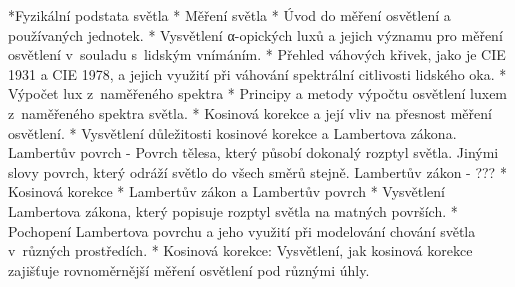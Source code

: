 \medskip
\begitems
    *Fyzikální podstata světla
    * Měření světla
    *     Úvod do měření osvětlení a používaných jednotek.
    *     Vysvětlení α-opických luxů a jejich významu pro měření osvětlení v~souladu s~lidským vnímáním.
    *     Přehled váhových křivek, jako je CIE 1931 a CIE 1978, a jejich využití při váhování spektrální citlivosti lidského oka.
    * Výpočet lux z~naměřeného spektra
    *     Principy a metody výpočtu osvětlení luxem z~naměřeného spektra světla.
    *     Kosinová korekce a její vliv na přesnost měření osvětlení.
       * Vysvětlení důležitosti kosinové korekce a Lambertova zákona.
Lambertův povrch - Povrch tělesa, který působí dokonalý rozptyl světla. Jinými slovy povrch, který odráží světlo do všech směrů stejně.
Lambertův zákon - ???
    * Kosinová korekce
    * Lambertův zákon a Lambertův povrch
    *     Vysvětlení Lambertova zákona, který popisuje rozptyl světla na matných površích.
    *     Pochopení Lambertova povrchu a jeho využití při modelování chování světla v~různých prostředích.
    *     Kosinová korekce: Vysvětlení, jak kosinová korekce zajišťuje rovnoměrnější měření osvětlení pod různými úhly.
\enditems

